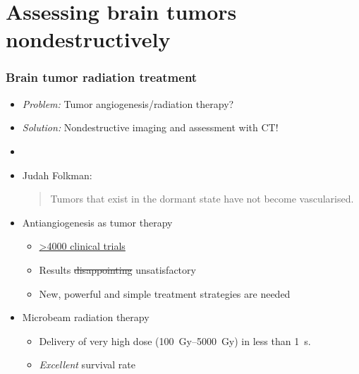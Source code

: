 \documentclass{beamer}              %
\newcommand{\uct}{\si{\micro}CT\xspace}
\begin{document}
\section{Assessing brain tumors nondestructively}
\label{sec:grenoble}
\begin{frame}
	\frametitle{Brain tumor radiation treatment}
	\begin{itemize}
		\item \emph{Problem:} Tumor angiogenesis/radiation therapy?
		\pause
		\item \emph{Solution:} Nondestructive imaging and assessment with \uct!
		\item[]
		\pause
		\item Judah Folkman: \blockquote[\cite{Sherwood1971}]{Tumors that exist in the dormant state have not become vascularised.}
		\item Antiangiogenesis as tumor therapy
		\begin{itemize}
			\item \href{https://clinicaltrials.gov/ct2/results?term=antiangiogenic}{\textgreater4000 clinical trials}
			\item Results \sout{disappointing} unsatisfactory
			\item New, powerful and simple treatment strategies are needed
		\end{itemize}
		\item Microbeam radiation therapy
		\begin{itemize}
			\item Delivery of very high dose (\SIrange{100}{5000}{\gray}) in less than \SI{1}{\second}.
			\item \emph{Excellent} survival rate \cite{Laissue1998}
		\end{itemize}
	\end{itemize}
\end{frame}
\end{document}
